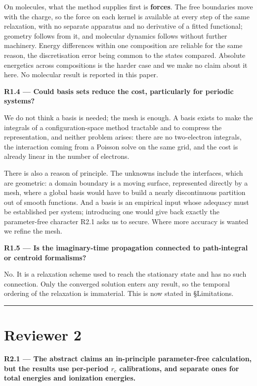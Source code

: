 \documentclass[11pt,a4paper]{article}
\begin{document}
On molecules, what the method supplies first is \textbf{forces}. The free boundaries move with the
charge, so the force on each kernel is available at every step of the same relaxation, with no
separate apparatus and no derivative of a fitted functional; geometry follows from it, and
molecular dynamics follows without further machinery. Energy differences within one composition
are reliable for the same reason, the discretisation error being common to the states compared.
Absolute energetics across compositions is the harder case and we make no claim about it here.
No molecular result is reported in this paper.

\textbf{R1.4 --- Could basis sets reduce the cost, particularly for periodic systems?}

We do not think a basis is needed; the mesh is enough. A basis exists to make the integrals of
a configuration-space method tractable and to compress the representation, and neither problem
arises: there are no two-electron integrals, the interaction coming from a Poisson solve on the
same grid, and the cost is already linear in the number of electrons.

There is also a reason of principle. The unknowns include the interfaces, which are geometric: a
domain boundary is a moving surface, represented directly by a mesh, where a global basis would
have to build a nearly discontinuous partition out of smooth functions. And a basis is an
empirical input whose adequacy must be established per system; introducing one would give back
exactly the parameter-free character R2.1 asks us to secure. Where more accuracy is wanted we
refine the mesh.

\textbf{R1.5 --- Is the imaginary-time propagation connected to path-integral or centroid formalisms?}

No. It is a relaxation scheme used to reach the stationary state and has no such connection.
Only the converged solution enters any result, so the temporal ordering of the relaxation is
immaterial. This is now stated in §Limitations.

\medskip\hrule\medskip

\section*{Reviewer 2}

\textbf{R2.1 --- The abstract claims an in-principle parameter-free calculation, but the results use
per-period $r_c$ calibrations, and separate ones for total energies and ionization energies.}
\end{document}
